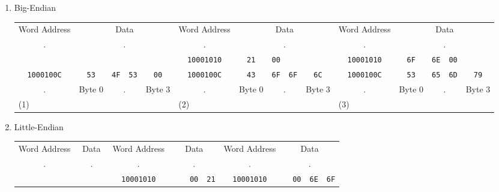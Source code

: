\documentclass[12pt]{article}
\begin{document}
    \begin{enumerate}
        \item Big-Endian
        \begin{table}[h!]
            \small
            \setlength\tabcolsep{2pt}
            \centering
            \begin{tabular}{ccccccccccccccc}
                Word Address & \multicolumn{4}{c}{Data} & Word Address & \multicolumn{4}{c}{Data} & Word Address & \multicolumn{4}{c}{Data} \\
                . & \multicolumn{4}{c}{.} & . & \multicolumn{4}{c}{.} & . & \multicolumn{4}{c}{.} \\
                & & & & & \texttt{10001010} & \texttt{21} & \texttt{00} & & & \texttt{10001010} &\texttt{6F} & \texttt{6E} & \texttt{00} & \\
                \texttt{1000100C} & \texttt{53} & \texttt{4F} & \texttt{53} & \texttt{00} & \texttt{1000100C} & \texttt{43} & \texttt{6F} & \texttt{6F} & \texttt{6С} & \texttt{1000100C} & \texttt{53} & \texttt{65} & \texttt{6D} & \texttt{79} \\
                . & \multicolumn{1}{l}{ {\scriptsize Byte 0}} & \multicolumn{2}{c}{.} & \multicolumn{1}{r}{ {\scriptsize Byte 3}} & . & \multicolumn{1}{l}{ {\scriptsize Byte 0}} & \multicolumn{2}{c}{.} & \multicolumn{1}{r}{ {\scriptsize Byte 3}} & . & \multicolumn{1}{l}{ {\scriptsize Byte 0}} & \multicolumn{2}{c}{.} & \multicolumn{1}{r}{ {\scriptsize Byte 3}} \\
                \multicolumn{5}{l}{(1)} & \multicolumn{5}{l}{(2)} & \multicolumn{5}{l}{(3)} \\
            \end{tabular}
        \end{table}
        \item Little-Endian
        \begin{table}[h!]
            \small
            \setlength\tabcolsep{2pt}
            \centering
            \begin{tabular}{ccccccccccccccc}
                Word Address & \multicolumn{4}{c}{Data} & Word Address & \multicolumn{4}{c}{Data} & Word Address & \multicolumn{4}{c}{Data} \\
                . & \multicolumn{4}{c}{.} & . & \multicolumn{4}{c}{.} & . & \multicolumn{4}{c}{.} \\
                & & & & & \texttt{10001010} & & & \texttt{00} & \texttt{21} & \texttt{10001010} & & \texttt{00} & \texttt{6E} & \texttt{6F} \\

\end{tabular}
\end{table}
\end{enumerate}
\end{document}
